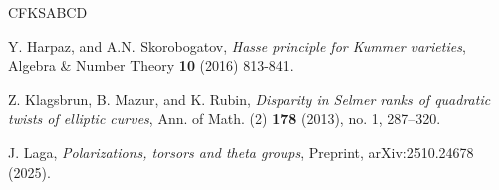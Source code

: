 \documentclass[10pt]{amsart}
\numberwithin{equation}{section}
\theoremstyle{remark}
\theoremstyle{definition}
\theoremstyle{definition}
\theoremstyle{definition}
\theoremstyle{definition}
\theoremstyle{definition}
\theoremstyle{definition}
\theoremstyle{definition}
\theoremstyle{definition}
\begin{document}
\begin{thebibliography}{CFKSABCD}
 
 Y. Harpaz, and A.N. Skorobogatov,  \textit{Hasse principle for Kummer varieties}, Algebra \& Number Theory \textbf{10} (2016) 813-841.
 
 Z. Klagsbrun, B. Mazur, and K. Rubin, \textit{Disparity in {S}elmer ranks of quadratic twists of elliptic curves}, Ann. of Math. (2) \textbf{178} (2013), no. 1, 287--320.
              
%
%
%

J. Laga, \textit{Polarizations, torsors and theta groups}, Preprint,  arXiv:2510.24678 (2025).

%              
%
%
%              
%
% 

              

\end{thebibliography}
\end{document}
